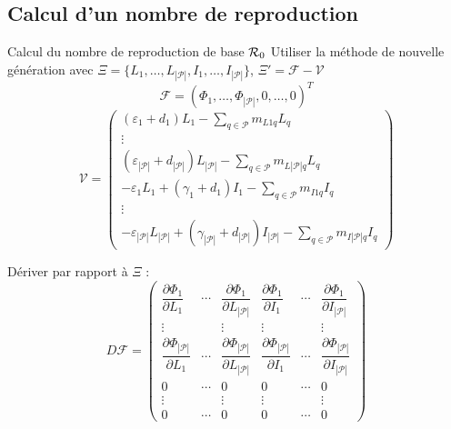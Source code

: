 \documentclass[aspectratio=169]{beamer}\usepackage[]{graphicx}\usepackage[]{xcolor}
\begin{document}
\subsection{Calcul d'un nombre de reproduction}


\begin{frame}{Calcul du nombre de reproduction de base $\mathcal{R}_0$}
Utiliser la méthode de nouvelle génération avec $\Xi=\{L_1,\ldots,L_{|\mathcal{P}|},I_1,\ldots,I_{|\mathcal{P}|}\}$, $\Xi'=\mathcal{F}-\mathcal{V}$
$$
\mathcal{F}=\left(\Phi_1,\ldots,\Phi_{|\mathcal{P}|},0,\ldots,0\right)^T
$$
$$
\mathcal{V}=
\begin{pmatrix}
\left( \varepsilon_{1}+d_{1}\right)L_{1}
-\sum\limits_{q\in\mathcal{P}} m_{L1q}L_{q} \\
\vdots \\
\left( \varepsilon_{|\mathcal{P}|}+d_{|\mathcal{P}|}\right)L_{|\mathcal{P}|}
-\sum\limits_{q\in\mathcal{P}} m_{L|\mathcal{P}|q}L_{q} \\
-\varepsilon_1L_1+(\gamma_1+d_1)I_1
-\sum\limits_{q\in\mathcal{P}} m_{I1q}I_{q} \\
\vdots \\
-\varepsilon_{|\mathcal{P}|}L_{|\mathcal{P}|}
+(\gamma_{|\mathcal{P}|}+d_{|\mathcal{P}|})I_{|\mathcal{P}|}
-\sum\limits_{q\in\mathcal{P}} m_{I|\mathcal{P}|q}I_{q}
\end{pmatrix}
$$
\end{frame}


\begin{frame}
Dériver par rapport à $\Xi$ :
$$
D\mathcal{F}
=
\begin{pmatrix}
\dfrac{\partial\Phi_1}{\partial L_1} & \cdots &
\dfrac{\partial\Phi_1}{\partial L_{|\mathcal{P}|}} & 
\dfrac{\partial\Phi_1}{\partial I_1} & \cdots &
\dfrac{\partial\Phi_1}{\partial I_{|\mathcal{P}|}} \\
\vdots & & \vdots & \vdots & & \vdots \\
\dfrac{\partial\Phi_{|\mathcal{P}|}}{\partial L_1} & \cdots &
\dfrac{\partial\Phi_{|\mathcal{P}|}}{\partial L_{|\mathcal{P}|}} & 
\dfrac{\partial\Phi_{|\mathcal{P}|}}{\partial I_1} & \cdots &
\dfrac{\partial\Phi_{|\mathcal{P}|}}{\partial I_{|\mathcal{P}|}} \\
0 & \cdots & 0 & 0 & \cdots & 0 \\
\vdots & & \vdots & \vdots & & \vdots \\
0 & \cdots & 0 & 0 & \cdots & 0
\end{pmatrix}
$$
\end{frame}
\end{document}

